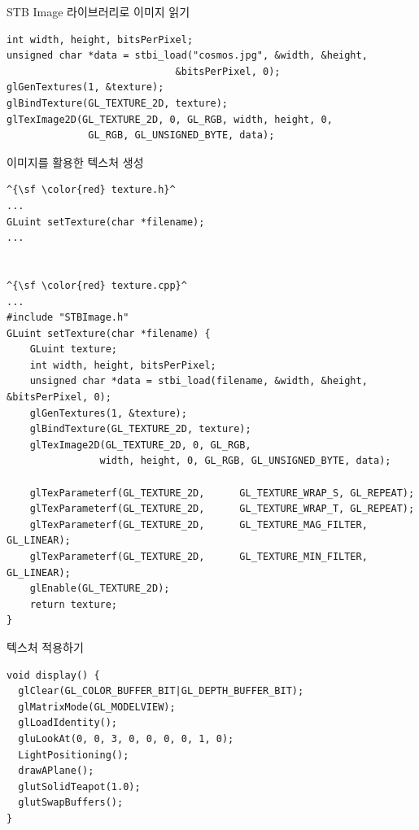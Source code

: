 \documentclass{beamer}
\begin{document}
\begin{frame}[fragile]{STB Image 라이브러리로 이미지 읽기}

\lstset{language=C++, escapechar=^} 
\begin{lstlisting}
int width, height, bitsPerPixel;
unsigned char *data = stbi_load("cosmos.jpg", &width, &height, 
                             &bitsPerPixel, 0);
glGenTextures(1, &texture);
glBindTexture(GL_TEXTURE_2D, texture);
glTexImage2D(GL_TEXTURE_2D, 0, GL_RGB, width, height, 0, 
              GL_RGB, GL_UNSIGNED_BYTE, data);
\end{lstlisting}

\end{frame}


\begin{frame}[fragile]{이미지를 활용한 텍스처 생성}

\lstset{language=C++, escapechar=^} 
\begin{lstlisting}
^{\sf \color{red} texture.h}^
...
GLuint setTexture(char *filename);
...


^{\sf \color{red} texture.cpp}^
...
#include "STBImage.h"
GLuint setTexture(char *filename) {
	GLuint texture;
	int width, height, bitsPerPixel;
	unsigned char *data = stbi_load(filename, &width, &height, &bitsPerPixel, 0);
	glGenTextures(1, &texture);
	glBindTexture(GL_TEXTURE_2D, texture);
	glTexImage2D(GL_TEXTURE_2D, 0, GL_RGB,
				width, height, 0, GL_RGB, GL_UNSIGNED_BYTE, data);

	glTexParameterf(GL_TEXTURE_2D, 		GL_TEXTURE_WRAP_S, GL_REPEAT);
	glTexParameterf(GL_TEXTURE_2D, 		GL_TEXTURE_WRAP_T, GL_REPEAT);
	glTexParameterf(GL_TEXTURE_2D, 		GL_TEXTURE_MAG_FILTER, GL_LINEAR);
	glTexParameterf(GL_TEXTURE_2D, 		GL_TEXTURE_MIN_FILTER, GL_LINEAR);
	glEnable(GL_TEXTURE_2D);
	return texture;
}
\end{lstlisting}

\end{frame}

\begin{frame}[fragile]{텍스처 적용하기}

\lstset{language=C++, escapechar=^} 
\begin{lstlisting}
void display() {
  glClear(GL_COLOR_BUFFER_BIT|GL_DEPTH_BUFFER_BIT);
  glMatrixMode(GL_MODELVIEW);
  glLoadIdentity();
  gluLookAt(0, 0, 3, 0, 0, 0, 0, 1, 0);
  LightPositioning();
  drawAPlane();
  glutSolidTeapot(1.0);
  glutSwapBuffers();
}
\end{lstlisting}

\end{frame}
\end{document}
